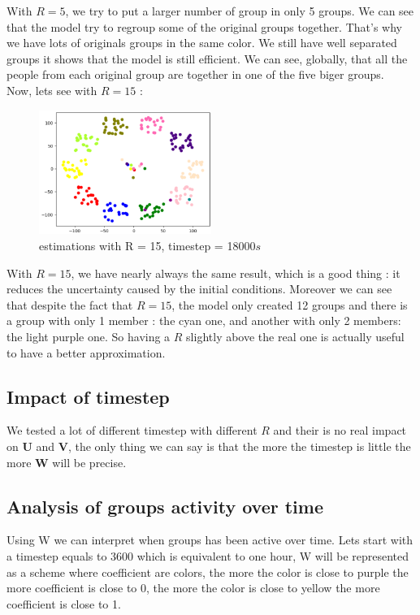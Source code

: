 \documentclass{article}
\begin{document}
With $R = 5$, we try to put a larger number of group in only 5 groups. We can see that the model try to regroup some of the original groups
together. That's why we have lots of originals groups in the same color. We still have well separated groups it shows that
the model is still efficient. We can see, globally, that all the people from each original group are together in one of the five biger groups.\\

Now, lets see with $R = 15$ :

\begin{figure}[H]
    \centering
    \includegraphics[width=0.5\textwidth]{images/R=15_t=18000.png}
    \caption{estimations with R = 15, timestep = 18000$s$}
\end{figure}

With $R = 15$, we have nearly always the same result, which is a good thing : it reduces the uncertainty caused by the initial conditions.
Moreover we can see that despite the fact that $R = 15$, the model only created 12 groups and there is a group with only 1 member : the cyan one, and another with only
2 members: the light purple one. So having a $R$ slightly above the real one is actually useful to have a better approximation.

\subsection{Impact of timestep}
We tested a lot of different timestep with different $R$ and their is no real impact on $\mathbf{U}$ and $\mathbf{V}$,
the only thing we can say is that the more the timestep is little the more $\mathbf{W}$ will be precise.

\subsection{Analysis of groups activity over time}

Using W we can interpret when groups has been active over time. Lets start with a timestep equals to 3600 which is equivalent to one hour,
W will be represented as a scheme where coefficient are colors, the more the color is close to purple the more coefficient is close to 0, the more
the color is close to yellow the more coefficient is close to 1.
\end{document}
